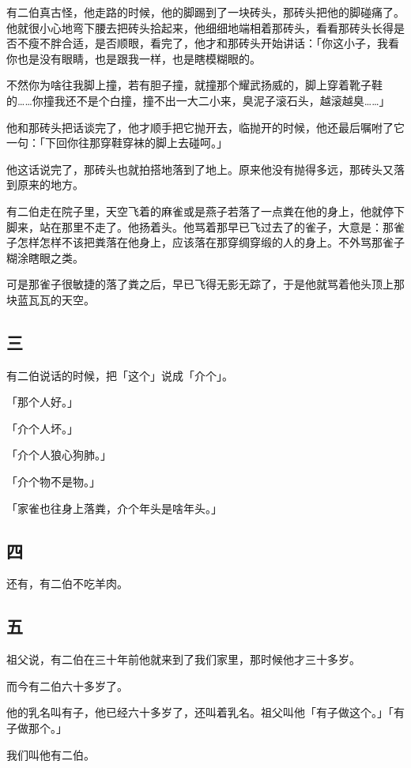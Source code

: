 \documentclass[UTF8]{ctexart}
\begin{document}
有二伯真古怪，他走路的时候，他的脚踢到了一块砖头，那砖头把他的脚碰痛了。他就很小心地弯下腰去把砖头拾起来，他细细地端相着那砖头，看看那砖头长得是否不瘦不胖合适，是否顺眼，看完了，他才和那砖头开始讲话：「你这小子，我看你也是没有眼睛，也是跟我一样，也是瞎模糊眼的。

不然你为啥往我脚上撞，若有胆子撞，就撞那个耀武扬威的，脚上穿着靴子鞋的……你撞我还不是个白撞，撞不出一大二小来，臭泥子滚石头，越滚越臭……」

他和那砖头把话谈完了，他才顺手把它抛开去，临抛开的时候，他还最后嘱咐了它一句：「下回你往那穿鞋穿袜的脚上去碰呵。」

他这话说完了，那砖头也就拍搭地落到了地上。原来他没有抛得多远，那砖头又落到原来的地方。

有二伯走在院子里，天空飞着的麻雀或是燕子若落了一点粪在他的身上，他就停下脚来，站在那里不走了。他扬着头。他骂着那早已飞过去了的雀子，大意是：那雀子怎样怎样不该把粪落在他身上，应该落在那穿绸穿缎的人的身上。不外骂那雀子糊涂瞎眼之类。

可是那雀子很敏捷的落了粪之后，早已飞得无影无踪了，于是他就骂着他头顶上那块蓝瓦瓦的天空。

\subsection{三}

有二伯说话的时候，把「这个」说成「介个」。

「那个人好。」

「介个人坏。」

「介个人狼心狗肺。」

「介个物不是物。」

「家雀也往身上落粪，介个年头是啥年头。」

\subsection{四}

还有，有二伯不吃羊肉。

\subsection{五}

祖父说，有二伯在三十年前他就来到了我们家里，那时候他才三十多岁。

而今有二伯六十多岁了。

他的乳名叫有子，他已经六十多岁了，还叫着乳名。祖父叫他「有子做这个。」「有子做那个。」

我们叫他有二伯。
\end{document}
